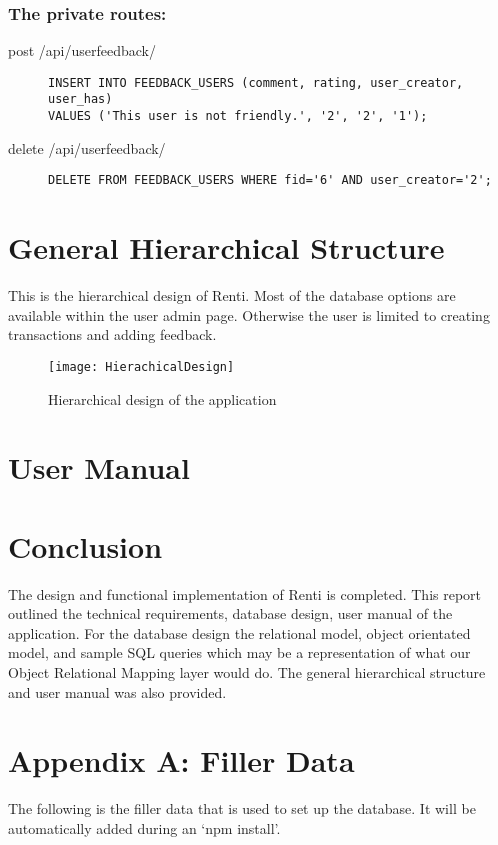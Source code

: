 \documentclass{article}
\begin{document}
\subsubsection{The private routes:}
\begin{description}
\item[post /api/userfeedback/] \mbox{}
\begin{lstlisting}[style=sql]
INSERT INTO FEEDBACK_USERS (comment, rating, user_creator, user_has)
VALUES ('This user is not friendly.', '2', '2', '1');
\end{lstlisting}
\item[delete /api/userfeedback/] \mbox{}
\begin{lstlisting}[style=sql]
DELETE FROM FEEDBACK_USERS WHERE fid='6' AND user_creator='2';
\end{lstlisting}
\end{description}

\section{General Hierarchical Structure}
This is the hierarchical design of Renti. Most of the database options are available within the user admin page. Otherwise the user is limited to creating transactions and adding feedback.
\begin{figure}[ht!]
    \centering
    \texttt{[image: HierachicalDesign]}
    \caption{Hierarchical design of the application}
    \label{fig:hierachDesign}
\end{figure}

\section{User Manual}

\section{Conclusion}
The design and functional implementation of Renti is completed. This report outlined the technical requirements, database design, user manual of the application. For the database design the relational model, object orientated model, and sample SQL queries which may be a representation of what our Object Relational Mapping layer would do. The general hierarchical structure and user manual was also provided.

\section{Appendix A: Filler Data}
The following is the filler data that is used to set up the database. It will be automatically added during an `npm install'.

\end{document}
